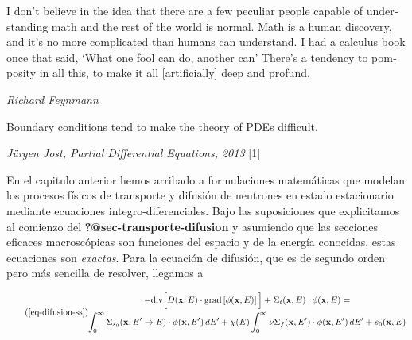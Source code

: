 \documentclass[
  12pt,
  a4paper,
  table]{scrbook}
\renewenvironment{quote}{\begin{mdframed}[style=exampledefault]}{\end{mdframed}}
\theoremstyle{plain}
\theoremstyle{definition}
\theoremstyle{plain}
\theoremstyle{plain}
\theoremstyle{remark}
\begin{document}
\newcommand{\omegaversor}{\hat{\symbf{\Omega}}}
\newcommand{\omegaprimaversor}{\hat{\symbf{\Omega}}^\prime}
\renewcommand{\vec}[1]{\mathbf{#1}}
\newcommand{\mat}[1]{\mathsf{#1}}

\begin{otherlanguage}{american}

\begin{chapterquote}

\begin{quote}
I don't believe in the idea that there are a few peculiar people capable
of understanding math and the rest of the world is normal. Math is a
human discovery, and it's no more complicated than humans can
understand. I had a calculus book once that said, `What one fool can do,
another can' There's a tendency to pomposity in all this, to make it all
{[}artificially{]} deep and profund.

\emph{Richard Feynmann}
\end{quote}

\begin{quote}
Boundary conditions tend to make the theory of PDEs difficult.

\emph{Jürgen Jost, Partial Differential Equations, 2013} {[}1{]}
\end{quote}

\end{chapterquote}

\end{otherlanguage}

En el capitulo anterior hemos arribado a formulaciones matemáticas que
modelan los procesos físicos de transporte y difusión de neutrones en
estado estacionario mediante ecuaciones integro-diferenciales. Bajo las
suposiciones que explicitamos al comienzo del
\textbf{?@sec-transporte-difusion} y asumiendo que las secciones
eficaces macroscópicas son funciones del espacio y de la energía
conocidas, estas ecuaciones son \emph{exactas}. Para la ecuación de
difusión, que es de segundo orden pero más sencilla de resolver,
llegamos a

\[ \tag{\ref{eq-difusion-ss}}
\begin{gathered}
 - \text{div} \Big[ D(\vec{x}, E) \cdot \text{grad} \left[ \phi(\vec{x}, E) \right] \Big]
 + \Sigma_t(\vec{x}, E) \cdot \phi(\vec{x}, E)
 = \\
\int_{0}^{\infty} \Sigma_{s_0}(\vec{x}, E^{\prime} \rightarrow E)  \cdot \phi(\vec{x}, E^\prime) \, dE^\prime +
\chi(E) \int_{0}^{\infty} \nu\Sigma_f(\vec{x}, E^\prime) \cdot \phi(\vec{x}, E^\prime) \, dE^\prime
+ s_0(\vec{x}, E)
\end{gathered}
\]
\end{document}
